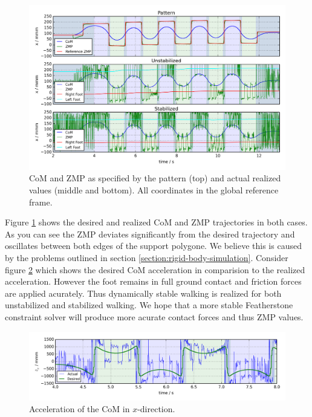 \documentclass[english,ngerman]{KITreprt}
\begin{document}
\begin{figure}[H]
\vspace*{-1em}
\includegraphics[width=\textwidth,resolution=300]{images/undisturbed_straight_x.png}
\caption{CoM and ZMP as specified by the pattern (top) and actual realized values (middle and bottom).
All coordinates in the global reference frame.}
\label{img:undisturbed-straight-x}
\end{figure}

Figure \ref{img:undisturbed-straight-x} shows the desired and realized
CoM and ZMP trajectories in both cases. As you can see the ZMP deviates
significantly from the desired trajectory and oscillates between both
edges of the support polygone. We believe this is caused by the problems
outlined in section \ref{section:rigid-body-simulation}. Consider figure
\ref{img:noisy-com-acc} which shows the desired CoM acceleration in
comparision to the realized acceleration. However the foot remains in
full ground contact and friction forces are applied acurately. Thus
dynamically stable walking is realized for both unstabilized and
stabilized walking. We hope that a more stable Featherstone constraint
solver will produce more acurate contact forces and thus ZMP values.

\begin{figure}[hbt]
\vspace*{-1em}
\includegraphics[width=\textwidth,resolution=300]{images/noisy_com_acc.png}
\caption{Acceleration of the CoM in $x$-direction.}
\label{img:noisy-com-acc}
\end{figure}
\end{document}
